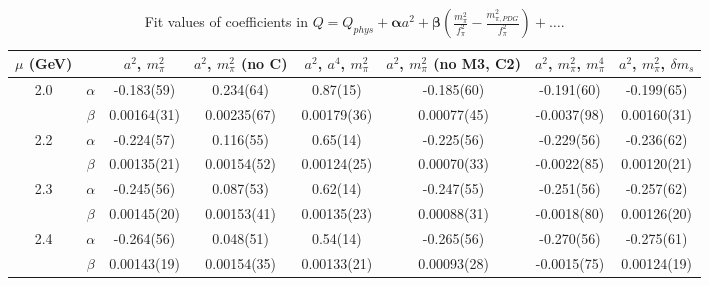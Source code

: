 \documentclass[12pt]{extarticle}
\begin{document}
\begin{table}[h!]
\begin{center}
\begin{tabular}{|c c|c|c|c|c|c|c|}
\hline
$\mu$ (GeV) &  & $a^2$, $m_\pi^2$& $a^2$, $m_\pi^2$ (no C)& $a^2$, $a^4$, $m_\pi^2$& $a^2$, $m_\pi^2$ (no M3, C2)& $a^2$, $m_\pi^2$, $m_\pi^4$& $a^2$, $m_\pi^2$, $\delta m_s$\\
\hline
\multirow{2}{0.5in}{2.0} & $\alpha$ & -0.183(59)& 0.234(64)& 0.87(15)& -0.185(60)& -0.191(60)& -0.199(65)\\
 & $\beta$ & 0.00164(31)& 0.00235(67)& 0.00179(36)& 0.00077(45)& -0.0037(98)& 0.00160(31)\\
\hline
\multirow{2}{0.5in}{2.2} & $\alpha$ & -0.224(57)& 0.116(55)& 0.65(14)& -0.225(56)& -0.229(56)& -0.236(62)\\
 & $\beta$ & 0.00135(21)& 0.00154(52)& 0.00124(25)& 0.00070(33)& -0.0022(85)& 0.00120(21)\\
\hline
\multirow{2}{0.5in}{2.3} & $\alpha$ & -0.245(56)& 0.087(53)& 0.62(14)& -0.247(55)& -0.251(56)& -0.257(62)\\
 & $\beta$ & 0.00145(20)& 0.00153(41)& 0.00135(23)& 0.00088(31)& -0.0018(80)& 0.00126(20)\\
\hline
\multirow{2}{0.5in}{2.4} & $\alpha$ & -0.264(56)& 0.048(51)& 0.54(14)& -0.265(56)& -0.270(56)& -0.275(61)\\
 & $\beta$ & 0.00143(19)& 0.00154(35)& 0.00133(21)& 0.00093(28)& -0.0015(75)& 0.00124(19)\\
\hline
\end{tabular}
\caption{Fit values of coefficients in $Q = Q_{phys} + \mathbf{\alpha} a^2 + \mathbf{\beta}\left(\frac{m_\pi^2}{f_\pi^2}-\frac{m_{\pi,PDG}^2}{f_\pi^2}\right) + \ldots$.}
\end{center}
\end{table}
























\clearpage
\end{document}
